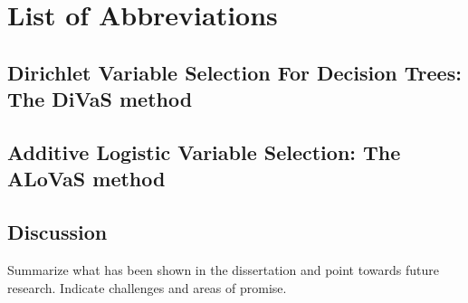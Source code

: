 \documentclass[12pt]{article}
\def\listofabbreviations{ \clearpage}
\begin{document}
\clearpage
{}
\chapter{\LARGE{\textbf{List of Abbreviations}}}
\listofabbreviations
\pagebreak

\cleardoublepage
{}



 
 




 \section{Dirichlet Variable Selection For Decision Trees: The DiVaS method}
\label{ch:var_select}



\section{Additive Logistic Variable Selection: The ALoVaS method}







\section{Discussion}
\label{ch:discuss}

Summarize what has been shown in the dissertation and point towards future research. Indicate challenges and areas of promise. 
\end{document}

